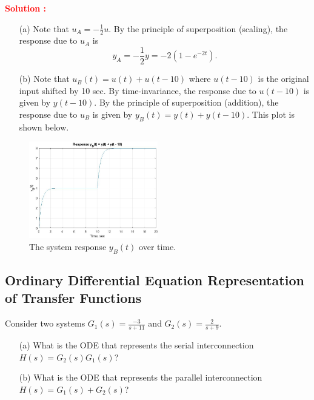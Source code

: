 \documentclass[12pt]{article}
\begin{document}
\textbf{\textcolor{red}{Solution :}} \\
\begin{enumerate}
    \item[(a)] Note that \(u_A = -\frac{1}{2}u\). By the principle of superposition (scaling), the response due to \(u_A\) is
    \[y_A = -\frac{1}{2}y = -2(1 - e^{-2t}).\]
    
    \item[(b)] Note that \(u_B(t) = u(t) + u(t - 10)\) where \(u(t - 10)\) is the original input shifted by 10 sec. By time-invariance, the response due to \(u(t - 10)\) is given by \(y(t - 10)\). By the principle of superposition (addition), the response due to \(u_B\) is given by \(y_B(t) = y(t) + y(t - 10)\). This plot is shown below.

\end{enumerate}


\begin{figure}[H]
    \centering
    \includegraphics[width=0.5\textwidth]{figs/1.4.jpg}
    \caption{The system response \(y_B(t)\) over time.}
    \label{fig:yb}
\end{figure}


\clearpage
\subsection{Ordinary Differential Equation Representation of Transfer Functions}

Consider two systems \(G_1(s) = \frac{-3}{s+11}\) and \(G_2(s) = \frac{2}{s+9}\).

\begin{enumerate}
    \item[(a)] What is the ODE that represents the serial interconnection \(H(s) = G_2(s)G_1(s)\)?

    \item[(b)] What is the ODE that represents the parallel interconnection \(H(s) = G_1(s) + G_2(s)\)?
\end{enumerate}
\end{document}
